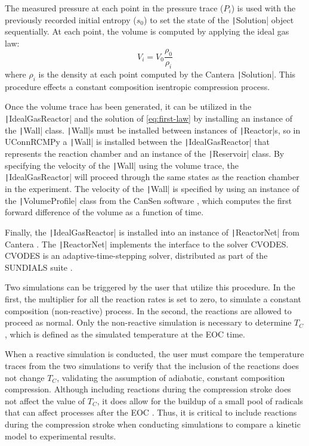 \documentclass[12pt]{../ussci}
\begin{document}
The measured pressure at each point in the pressure trace (\(P_i\)) is
used with the previously recorded initial entropy (\(s_0\)) to set the
state of the \texttt|Solution| object sequentially. At each point, the
volume is computed by applying the ideal gas law:
%
\begin{equation}
 V_i = V_0 \frac{\rho_0}{\rho_i}
\end{equation}
%
where \(\rho_i\) is the density at each point computed by the Cantera
\texttt|Solution|. This procedure effects a constant composition
isentropic compression process.

Once the volume trace has been generated, it can be utilized in the
\texttt|IdealGasReactor| and the solution of \cref{eq:first-law} by installing an instance of the
\texttt|Wall| class. \texttt|Wall|s must be installed between instances
of \texttt|Reactor|s, so in UConnRCMPy a \texttt|Wall| is installed
between the \texttt|IdealGasReactor| that represents the reaction
chamber and an instance of the \texttt|Reservoir| class. By specifying
the velocity of the \texttt|Wall| using the volume trace, the
\texttt|IdealGasReactor| will proceed through the same states as the
reaction chamber in the experiment. The velocity of the \texttt|Wall| is
specified by using an instance of the \texttt|VolumeProfile| class from
the CanSen software \autocite{cansen}, which computes the first forward
difference of the volume as a function of time.

Finally, the \texttt|IdealGasReactor| is installed into an instance of
\texttt|ReactorNet| from Cantera \autocite{cantera}. The
\texttt|ReactorNet| implements the interface to the solver CVODES.
CVODES is an adaptive-time-stepping solver, distributed as part of the
SUNDIALS suite \autocite{Hindmarsh2005}.

Two simulations can be triggered by the user that utilize this
procedure. In the first, the multiplier for all the reaction rates is
set to zero, to simulate a constant composition (non-reactive) process.
In the second, the reactions are allowed to proceed as normal. Only the
non-reactive simulation is necessary to determine \(T_C\), which is
defined as the simulated temperature at the EOC time.

When a reactive simulation is conducted, the user must compare the
temperature traces from the two simulations to verify that the inclusion
of the reactions does not change \(T_C\), validating the assumption of
adiabatic, constant composition compression. Although including
reactions during the compression stroke does not affect the value of
\(T_C\), it does allow for the buildup of a small pool of radicals that
can affect processes after the EOC \autocite{Mittal2008}. Thus, it is
critical to include reactions during the compression stroke when
conducting simulations to compare a kinetic model to experimental
results.
\end{document}
